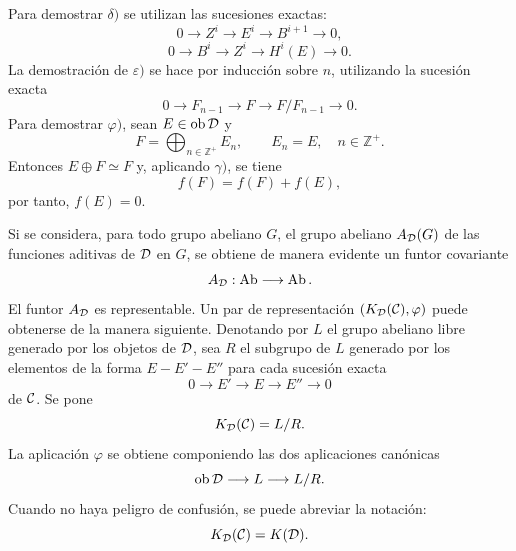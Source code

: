Para demostrar $\delta)$ se utilizan las sucesiones exactas:
\[
0\longrightarrow Z^i\longrightarrow E^i\longrightarrow B^{i+1}\longrightarrow 0,
\]
\[
0\longrightarrow B^i\longrightarrow Z^i\longrightarrow H^i(E)\longrightarrow 0.
\]
La demostración de $\varepsilon)$ se hace por inducción sobre $n$, utilizando la sucesión exacta
\[
0\longrightarrow F_{n-1}\longrightarrow F\longrightarrow F/F_{n-1}\longrightarrow 0.
\]
Para demostrar $\varphi)$, sean $E\in\operatorname{ob}\mathcal D$ y
\[
F=\bigoplus_{n\in\mathbb Z^+}E_n,\qquad E_n=E,\quad n\in\mathbb Z^+.
\]
Entonces $E\oplus F\simeq F$ y, aplicando $\gamma)$, se tiene
\[
f(F)=f(F)+f(E),
\]
por tanto, $f(E)=0$.

Si se considera, para todo grupo abeliano $G$, el grupo abeliano $A_{\mathcal D}(G)$ de las funciones aditivas de $\mathcal D$ en $G$, se obtiene de manera evidente un funtor covariante
\[
A_{\mathcal D}:\operatorname{Ab}\longrightarrow\operatorname{Ab}.
\]
El funtor $A_{\mathcal D}$ es representable. Un par de representación $(K_{\mathcal D}(\mathcal C),\varphi)$ puede obtenerse de la manera siguiente. Denotando por $L$ el grupo abeliano libre generado por los objetos de $\mathcal D$, sea $R$ el subgrupo de $L$ generado por los elementos de la forma $E-E'-E''$ para cada sucesión exacta
\[
0\longrightarrow E'\longrightarrow E\longrightarrow E''\longrightarrow 0
\]
de $\mathcal C$. Se pone
\[
K_{\mathcal D}(\mathcal C)=L/R.
\]
La aplicación $\varphi$ se obtiene componiendo las dos aplicaciones canónicas
\[
\operatorname{ob}\mathcal D\longrightarrow L\longrightarrow L/R.
\]
Cuando no haya peligro de confusión, se puede abreviar la notación:
\[
K_{\mathcal D}(\mathcal C)=K(\mathcal D).
\]
